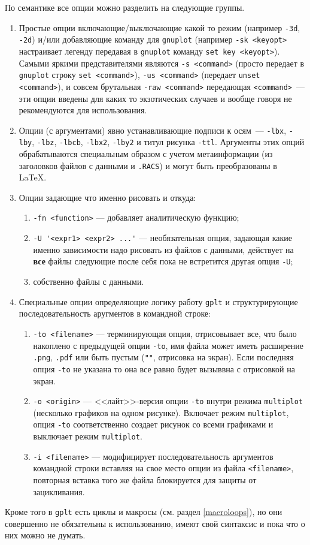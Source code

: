 \documentclass[12pt]{article}
\def\gplt{{\tt gplt}}
\def\gnuplot{{\tt gnuplot}}
\def\png{{\tt .png}}
\def\pdf{{\tt .pdf}}
\begin{document}
По семантике все опции можно разделить на следующие группы.
\begin{enumerate}
\item Простые опции включающие/выключающие какой то режим (например \verb'-3d', \verb'-2d')
  и/или добавляющие команду для \gnuplot{} (например \verb'-sk <keyopt>' настраивает легенду передавая в \gnuplot{} команду \verb'set key <keyopt>').
  Самыми яркими представителями являются \verb'-s <command>' (просто передает в \gnuplot{} строку \verb'set <command>'),
  \verb'-us <command>' (передает \verb'unset <command>'), и совсем брутальная \verb'-raw <command>' передающая \verb'<command>'~---
  эти опции введены для каких то экзотических случаев и вообще говоря не рекомендуются для использования. 
\item Опции (с аргументами) явно устанавливающие подписи к осям~--- \verb'-lbx', \verb'-lby', \verb'-lbz', \verb'-lbcb', \verb'-lbx2', \verb'-lby2'
  и титул рисунка \verb'-ttl'. Аргументы этих опций обрабатываются специальным образом с учетом метаинформации (из заголовков файлов с данными и \verb'.RACS') и
  могут быть преобразованы в \LaTeX{}.
\item Опции задающие что именно рисовать и откуда:
  \begin{enumerate}
  \item \verb'-fn <function>' --- добавляет аналитическую функцию;
  \item \verb|-U '<expr1> <expr2> ...'| --- необязательная опция, задающая какие именно зависимости надо рисовать из файлов с данными, действует на {\bf все} файлы
    следующие после себя пока не встретится другая опция \verb'-U';
  \item собственно файлы с данными. 
  \end{enumerate}
\item Специальные опции определяющие логику работу \gplt{} и структурирующие последовательность аругментов в командной строке:
  \begin{enumerate}
  \item \verb'-to <filename>' --- терминирующая опция, отрисовывает все, что было накоплено с предыдущей опции \verb'-to', имя файла может иметь расширение \png, \pdf{}
    или быть пустым (\verb|""|, отрисовка на экран). Если последняя опция \verb'-to' не указана то она все равно будет вызыввна с отрисовкой на экран.
  \item \verb'-o <origin>' --- <<лайт>>-версия опции \verb'-to' внутри режима \verb'multiplot' (несколько графиков на одном рисунке). Включает режим
    \verb'multiplot', опция \verb'-to' соответственно создает рисунок со всеми графиками и выключает режим \verb'multiplot'.
  \item\verb'-i <filename>' --- модифицирует последовательность аргументов командной строки вставляя на свое место опции из файла \verb'<filename>',
    повторная вставка того же файла блокируется для защиты от зацикливания.
  \end{enumerate}
\end{enumerate}
Кроме того в \gplt{} есть циклы и макросы (см. раздел \ref{macroloops}), но они совершенно не обязательны к использованию, имеют свой синтаксис и пока что
о них можно не думать.
\end{document}
